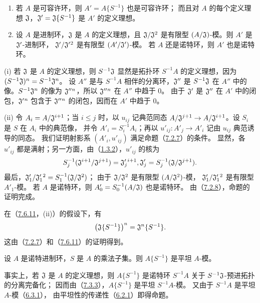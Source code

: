 \begin{enumerate}[label=(\roman*)]
\item 若 $A$ 是可容许环，则 $A'=A\{S^{-1}\}$ 也是可容许环；
而且对 $A$ 的每个定义理想 $\mathfrak J$，$\mathfrak J'=\mathfrak J\{S^{-1}\}$ 是 $A'$ 的定义理想。
\item 设 $A$ 是进制环，$\mathfrak J$ 是 $A$ 的定义理想，且
$\mathfrak J/\mathfrak J^2$ 是有限型 $(A/\mathfrak J)$-模。则 $A'$ 是 $\mathfrak J'$-进制环，
$\mathfrak J'/\mathfrak J'{}^2$ 是有限型 $(A'/\mathfrak J')$-模。
若 $A$ 还是诺特环，则 $A'$ 也是诺特环。
\end{enumerate}

(i) 若 $\mathfrak J$ 是 $A$ 的定义理想，则 $S^{-1}\mathfrak J$ 显然是拓扑环
$S^{-1}A$ 的定义理想，因为 $(S^{-1}\mathfrak J)^n=S^{-1}\mathfrak J^n$。
设 $A''$ 是与 $S^{-1}A$ 相伴的分离环，$\mathfrak J''$ 是 $S^{-1}\mathfrak J$ 在 $A''$
中的像。$S^{-1}\mathfrak J^n$ 的像为 $\mathfrak J''{}^n$，所以 $\mathfrak J''{}^n$ 在 $A''$ 中趋于 $0$。
由于 $\mathfrak J'$ 是 $\mathfrak J''$ 在 $A'$ 中的闭包，$\mathfrak J'{}^n$ 包含于
$\mathfrak J''{}^n$ 的闭包，因而在 $A'$ 中趋于 $0$。

(ii) 令 $A_i=A/\mathfrak J^{i+1}$；当 $i\leq j$ 时，以 $u_{ij}$ 记典范同态
$A/\mathfrak J^{j+1}\to A/\mathfrak J^{i+1}$。设 $S_i$ 是 $S$ 在 $A_i$ 中的典范像，
并令 $A'_i=S_i^{-1}A_i$；再以 $u'_{ij}:A'_j\to A'_i$ 记由
$u_{ij}$ 典范诱导的同态。
我们证明射影系 $(A'_i,u'_{ij})$ 满足命题（\hyperlink{para:0:7.2.7}{7.2.7}）的条件。
显然，各 $u'_{ij}$ 都是满射；另一方面，由（\hyperlink{para:0:1.3.2}{1.3.2}），$u'_{ij}$ 的核为
\[
 S_j^{-1}(\frJ^{i+1}/\frJ^{j+1})=\frJ_j'{}^{i+1},
 \qquad
 \frJ'_j=S_j^{-1}(\frJ/\frJ^{j+1}).
\]
最后，$\mathfrak J'_1/\mathfrak J_1'{}^2=S_1^{-1}(\mathfrak J/\mathfrak J^2)$；
由于 $\mathfrak J/\mathfrak J^2$ 是有限型 $(A/\mathfrak J^2)$-模，
$\mathfrak J'_1/\mathfrak J_1'{}^2$ 是有限型 $A'_1$-模。
若 $A$ 是诺特环，则 $A'_0=S_0^{-1}(A/\mathfrak J)$ 也是诺特环。
由（\hyperlink{para:0:7.2.8}{7.2.8}），命题的证明完成。

在（\hyperlink{para:0:7.6.11}{7.6.11}，(ii)）的假设下，有
\[
 \bigl(\mathfrak J\{S^{-1}\}\bigr)^n=\mathfrak J^n\{S^{-1}\}.
\]
这由（\hyperlink{para:0:7.2.7}{7.2.7}）和（\hyperlink{para:0:7.6.11}{7.6.11}）的证明得到。

设 $A$ 是诺特进制环，$S$ 是 $A$ 的乘法子集。则 $A\{S^{-1}\}$ 是平坦 $A$-模。

事实上，若 $\mathfrak J$ 是 $A$ 的定义理想，则 $A\{S^{-1}\}$ 是诺特环
$S^{-1}A$ 关于 $S^{-1}\mathfrak J$-预进拓扑的分离完备化；
因而由（\hyperlink{para:0:7.3.3}{7.3.3}），$A\{S^{-1}\}$ 是平坦 $S^{-1}A$-模。
又由于 $S^{-1}A$ 是平坦 $A$-模（\hyperlink{para:0:6.3.1}{6.3.1}），
由平坦性的传递性（\hyperlink{para:0:6.2.1}{6.2.1}）即得命题。

